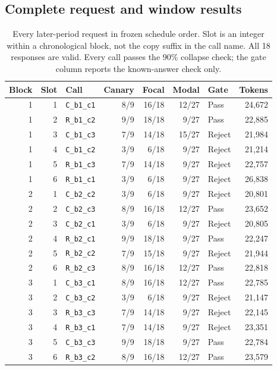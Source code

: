 \subsection{Complete request and window results}
\begin{table}[htbp]\centering\small
\caption{Every later-period request in frozen schedule order. Slot is an integer within a chronological block, not the copy suffix in the call name. All 18 responses are valid. Every call passes the 90\% collapse check; the gate column reports the known-answer check only.}
\label{tab:canary_stability_calls}
\begin{tabular}{@{}rrlrrrlr@{}}\toprule
Block & Slot & Call & Canary & Focal & Modal & Gate & Tokens \\\midrule
1 & 1 & \texttt{C\_b1\_c1} & 8/9 & 16/18 & 12/27 & Pass & 24,672 \\
1 & 2 & \texttt{R\_b1\_c2} & 9/9 & 18/18 & 9/27 & Pass & 22,885 \\
1 & 3 & \texttt{C\_b1\_c3} & 7/9 & 14/18 & 15/27 & Reject & 21,984 \\
1 & 4 & \texttt{C\_b1\_c2} & 3/9 & 6/18 & 9/27 & Reject & 21,214 \\
1 & 5 & \texttt{R\_b1\_c3} & 7/9 & 14/18 & 9/27 & Reject & 22,757 \\
1 & 6 & \texttt{R\_b1\_c1} & 3/9 & 6/18 & 9/27 & Reject & 26,838 \\
2 & 1 & \texttt{C\_b2\_c2} & 3/9 & 6/18 & 9/27 & Reject & 20,801 \\
2 & 2 & \texttt{C\_b2\_c3} & 8/9 & 16/18 & 12/27 & Pass & 23,652 \\
2 & 3 & \texttt{C\_b2\_c1} & 3/9 & 6/18 & 9/27 & Reject & 20,805 \\
2 & 4 & \texttt{R\_b2\_c1} & 9/9 & 18/18 & 9/27 & Pass & 22,247 \\
2 & 5 & \texttt{R\_b2\_c2} & 7/9 & 15/18 & 9/27 & Reject & 21,944 \\
2 & 6 & \texttt{R\_b2\_c3} & 8/9 & 16/18 & 12/27 & Pass & 22,818 \\
3 & 1 & \texttt{C\_b3\_c1} & 8/9 & 16/18 & 12/27 & Pass & 22,785 \\
3 & 2 & \texttt{C\_b3\_c2} & 3/9 & 6/18 & 9/27 & Reject & 21,147 \\
3 & 3 & \texttt{R\_b3\_c3} & 7/9 & 14/18 & 9/27 & Reject & 22,145 \\
3 & 4 & \texttt{R\_b3\_c1} & 7/9 & 14/18 & 9/27 & Reject & 23,351 \\
3 & 5 & \texttt{C\_b3\_c3} & 9/9 & 18/18 & 9/27 & Pass & 22,784 \\
3 & 6 & \texttt{R\_b3\_c2} & 8/9 & 16/18 & 12/27 & Pass & 23,579 \\
\bottomrule\end{tabular}\end{table}

